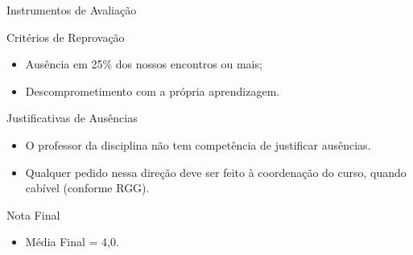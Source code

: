 \documentclass[xcolor=dvipsnames,table]{beamer}
\begin{document}
\begin{frame}{Instrumentos de Avaliação}
    \begin{alertblock}{Critérios de Reprovação}
        \begin{itemize}
            \item Ausência em 25\% dos nossos encontros ou mais;
            \item Descomprometimento com a própria aprendizagem.
        \end{itemize}
    \end{alertblock} \pause
    \begin{block}{Justificativas de Ausências}
        \begin{itemize}
            \item O professor da disciplina não tem competência de justificar ausências. 
            \item Qualquer pedido nessa direção deve ser feito à coordenação do curso, quando cabível (conforme RGG).
        \end{itemize}
    \end{block} \pause
    \begin{alertblock}{Nota Final}
        \begin{itemize}
            \item Média Final = 4,0.
        \end{itemize}
    \end{alertblock}
\end{frame}



	
\end{document}
